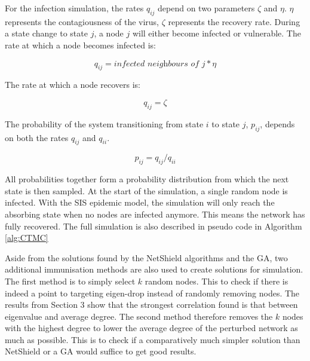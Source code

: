 \documentclass[11pt]{article}
\theoremstyle{definition}
\begin{document}
For the infection simulation, the rates $q_{ij}$ depend on two parameters $\zeta$ and $\eta$. $\eta$ represents the contagiousness of the virus, $\zeta$ represents the recovery rate. During a state change to state $j$, a node $j$ will either become infected or vulnerable. The rate at which a node becomes infected is:

\begin{equation}
    q_{ij} = \textit{infected neighbours of j} * \eta
\end{equation}

The rate at which a node recovers is:

\begin{equation}
    q_{ij} = \zeta
\end{equation}

The probability of the system transitioning from state $i$ to state $j$, $p_{ij}$, depends on both the rates $q_{ij}$ and $q_{ii}$.

\begin{equation}
    p_{ij} = q_{ij} / q_{ii}
\end{equation}

All probabilities together form a probability distribution from which the next state is then sampled. At the start of the simulation, a single random node is infected. With the SIS epidemic model, the simulation will only reach the absorbing state when no nodes are infected anymore. This means the network has fully recovered. The full simulation is also described in pseudo code in Algorithm \ref{alg:CTMC}

Aside from the solutions found by the NetShield algorithms and the GA, two additional immunisation methods are also used to create solutions for simulation. The first method is to simply select $k$ random nodes. This to check if there is indeed a point to targeting eigen-drop instead of randomly removing nodes. The results from Section 3 show that the strongest correlation found is that between eigenvalue and average degree. The second method therefore removes the $k$ nodes with the highest degree to lower the average degree of the perturbed network as much as possible. This is to check if a comparatively much simpler solution than NetShield or a GA would suffice to get good results.
\end{document}
